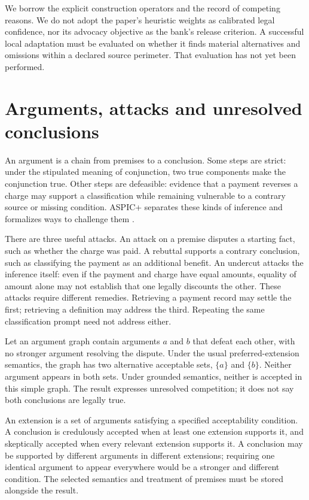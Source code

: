 \documentclass[12pt,a4paper,oneside,openany]{book}
\begin{document}
We borrow the explicit construction operators and the record of competing
reasons. We do not adopt the paper's heuristic weights as calibrated legal
confidence, nor its advocacy objective as the bank's release criterion. A
successful local adaptation must be evaluated on whether it finds material
alternatives and omissions within a declared source perimeter. That evaluation
has not yet been performed.

\section{Arguments, attacks and unresolved conclusions}

An argument is a chain from premises to a conclusion. Some steps are strict:
under the stipulated meaning of conjunction, two true components make the
conjunction true. Other steps are defeasible: evidence that a payment reverses a
charge may support a classification while remaining vulnerable to a contrary
source or missing condition. ASPIC+ separates these kinds of inference and
formalizes ways to challenge them \citep[sections 2--3]{aspic2010}.

There are three useful attacks. An attack on a premise disputes a starting fact,
such as whether the charge was paid. A rebuttal supports a contrary conclusion,
such as classifying the payment as an additional benefit. An undercut attacks the
inference itself: even if the payment and charge have equal amounts, equality of
amount alone may not establish that one legally discounts the other. These
attacks require different remedies. Retrieving a payment record may settle the
first; retrieving a definition may address the third. Repeating the same
classification prompt need not address either.

Let an argument graph contain arguments $a$ and $b$ that defeat each other, with
no stronger argument resolving the dispute. Under the usual preferred-extension
semantics, the graph has two alternative acceptable sets, $\{a\}$ and $\{b\}$.
Neither argument appears in both sets. Under grounded semantics, neither is
accepted in this simple graph. The result expresses unresolved competition; it
does not say both conclusions are legally true.

An extension is a set of arguments satisfying a specified acceptability
condition. A conclusion is credulously accepted when at least one extension
supports it, and skeptically accepted when every relevant extension supports it.
A conclusion may be supported by different arguments in different extensions;
requiring one identical argument to appear everywhere would be a stronger and
different condition. The selected semantics and treatment of premises must be
stored alongside the result.
\end{document}
